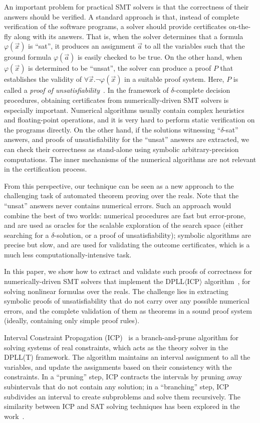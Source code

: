 \documentclass[envcountsect]{llncs}
\begin{document}
An important problem
for practical SMT solvers is that the correctness
of their answers should be verified. A standard approach is that, instead of
complete verification of the software programs, a solver should provide
certificates on-the-fly along with its answers. That is, when the solver
determines that a formula $\varphi(\vec x)$ is ``sat'', it produces an
assignment $\vec a$ to all the
variables such that the ground formula $\varphi(\vec a)$ is easily checked to be
true. On the other hand, when $\varphi(\vec x)$ is determined to be ``unsat'',
the solver can produce a proof $P$ that establishes the validity of $\forall
\vec x.\neg\varphi(\vec x)$ in a suitable proof system. Here, $P$ is called a
{\em proof of unsatisfiability}~\cite{}. In the framework of $\delta$-complete
decision procedures, obtaining certificates from numerically-driven SMT solvers
is especially important. Numerical algorithms usually contain complex heuristics
and floating-point operations, and it is very hard to perform static
verification on the programs directly. On the other hand, if the solutions
witnessing ``$\delta$-sat'' answers, and proofs of unsatisfiability for the
``unsat'' answers are extracted,
we can check their correctness as stand-alone using symbolic
arbitrary-precision computations. The inner mechanisms of the numerical
algorithms are not relevant in the certification process.

From this perspective, our technique can be seen as a new approach to the challenging
task of automated theorem proving over the reals. Note that the ``unsat''
answers never contains numerical errors. Such an approach
 would combine the best of two worlds: numerical procedures are
fast but error-prone, and are used as oracles for the scalable exploration of
the search space (either searching for a $\delta$-solution, or a proof of
unsatisfiability); symbolic algorithms are precise but slow, and are used for
validating the outcome certificates, which is a much less
computationally-intensive task.

In this paper, we show how to extract and validate such proofs
of correctness for numerically-driven SMT solvers that implement the
DPLL$\langle$ICP$\rangle$ algorithm~\cite{}, for solving nonlinear formulas over
the reals. The challenge lies in extracting symbolic proofs of unsatisfiability
that do not carry over any possible numerical errors, and the complete
validation of them as theorems in a sound proof system (ideally, containing only
simple proof rules).

Interval Constraint Propagation (ICP)~\cite{} is a branch-and-prune algorithm
for solving systems of real constraints, which acts as the theory solver in the
DPLL(T) framework. The algorithm maintains an interval
assignment to all the variables, and update the assignments based on their
consistency with the constraints. In a ``pruning''
step, ICP contracts the intervals by pruning away subintervals that do not
contain any solution; in a ``branching'' step, ICP subdivides an interval to
create subproblems and solve them recursively. The similarity between ICP and SAT solving techniques has
been explored in the work~\cite{}.
\end{document}
